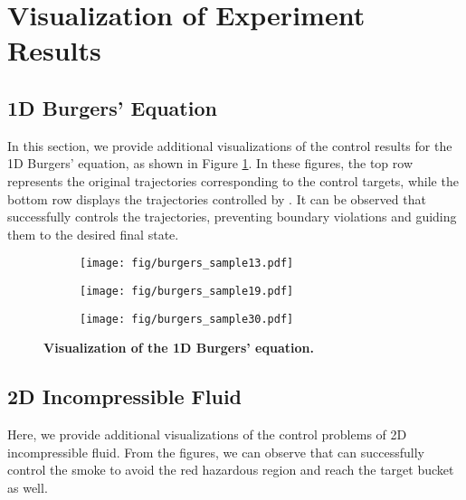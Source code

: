 \section{Visualization of Experiment Results}
\subsection{1D Burgers' Equation}
In this section, we provide additional visualizations of the control results for the 1D Burgers' equation, as shown in Figure \ref{fig:1d_add}. In these figures, the top row represents the original trajectories corresponding to the control targets, while the bottom row displays the trajectories controlled by \proj. It can be observed that \proj successfully controls the trajectories, preventing boundary violations and guiding them to the desired final state.

\begin{figure}[H]
    \centering
    \begin{subfigure}{0.7\textwidth}
        \centering
        \texttt{[image: fig/burgers\_sample13.pdf]}
    \end{subfigure}
    \vspace{6pt}
    
    \begin{subfigure}{0.7\textwidth}
        \centering
        \texttt{[image: fig/burgers\_sample19.pdf]}
    \end{subfigure}
    \vspace{6pt}
    
    \begin{subfigure}{0.7\textwidth}
        \centering
        \texttt{[image: fig/burgers\_sample30.pdf]}
    \end{subfigure}
    \vspace{6pt}
    
    \caption{\textbf{Visualization of the 1D Burgers’ equation.}}
    \label{fig:1d_add}
\end{figure}



    
    

\subsection{2D Incompressible Fluid}
Here, we provide additional visualizations of the control problems of 2D incompressible fluid. From the figures, we can observe that \proj can successfully control the smoke to avoid the red hazardous region and reach the target bucket as well.

